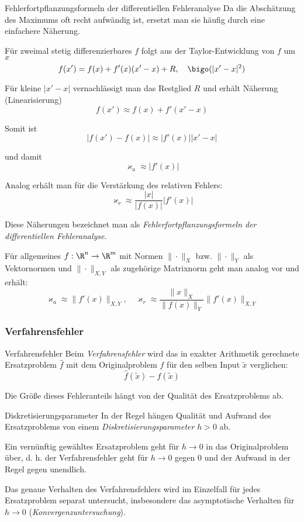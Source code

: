\begin{defi}{Fehlerfortpflanzungsformeln der differentiellen Fehleranalyse}
    Da die Abschätzung des Maximums oft recht aufwändig ist, ersetzt man sie häufig durch eine einfachere Näherung. 

    Für zweimal stetig differenzierbares $f$ folgt aus der Taylor-Entwicklung von $f$ um $x$
    \[
        f(x') = f(x) + f'(x)(x' - x) + R, \quad \bigo(|x' - x|^2)    
    \]

    Für kleine $|x' - x|$ vernachlässigt man das Restglied $R$ und erhält Näherung (Linearisierung)
    \[ 
        f(x') \approx f(x) + f'(x' - x)
    \]

    Somit ist 
    \[
        |f(x') - f(x)| \approx |f'(x)| |x' - x|    
    \]
    
    und damit
    \[
        \varkappa_a \approx |f'(x)|    
    \]
    
    Analog erhält man für die Verstärkung des relativen Fehlers:
    \[ 
        \varkappa_r \approx \frac{|x|}{|f(x)|} |f'(x)|
    \]

    Diese Näherungen bezeichnet man als \emph{Fehlerfortpflanzungsformeln der differentiellen Fehleranalyse}.

    Für allgemeines $f: \R^n \to \R^m$ mit Normen $\| \cdot \|_X$ bzw. $\| \cdot \|_Y$ als Vektornormen und $\| \cdot \|_{X, Y}$ als zugehörige Matrixnorm geht man analog vor und erhält: 
    \[
        \varkappa_a \approx \|f'(x)\|_{X, Y}, \quad \varkappa_r \approx \frac{\|x\|_X}{\|f(x)\|_Y} \|f'(x)\|_{X, Y}
    \]
\end{defi}

\subsubsection{Verfahrensfehler}

\begin{defi}{Verfahrensfehler}
    Beim \emph{Verfahrensfehler} wird das in exakter Arithmetik gerechnete Ersatzproblem $\hat{f}$ mit dem Originalproblem $f$ für den selben Input $\tilde{x}$ verglichen:
    \[
        \hat{f}(\tilde{x}) - f(\tilde{x})
    \]

    Die Größe dieses Fehleranteils hängt von der Qualität des Ersatzproblems ab.
\end{defi}

\begin{defi}{Diskretisierungsparameter}
    In der Regel hängen Qualität und Aufwand des Ersatzproblems von einem \emph{Diskretisierungsparameter} $h > 0$ ab. 

    Ein vernünftig gewähltes Ersatzproblem geht für $h \to 0$ in das Originalproblem über, d. h. der Verfahrensfehler geht für $h \to 0$ gegen 0 und der Aufwand in der Regel gegen unendlich.

    Das genaue Verhalten des Verfahrensfehlers wird im Einzelfall für jedes Ersatzproblem separat untersucht, insbesondere das asymptotische Verhalten für $h \to 0$ (\emph{Konvergenzuntersuchung}).
\end{defi}

